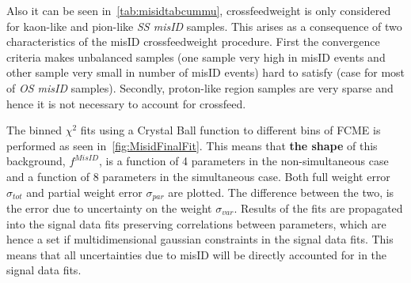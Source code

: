 Also it can be seen in~\autoref{tab:misidtabcummu}, crossfeedweight is only considered for kaon-like and pion-like \textit{SS misID} samples. This arises as a consequence of two characteristics of the misID crossfeedweight procedure. First the convergence criteria makes unbalanced samples (one sample very high in misID events and other sample very small in number of misID events) hard to satisfy (case for most of \textit{OS misID} samples). Secondly, proton-like region samples are very sparse and hence it is not necessary to account for crossfeed. %

The binned $\chi^{2}$ fits using a Crystal Ball function to different bins of FCME is performed as seen in~\autoref{fig:MisidFinalFit}. This means that \textbf{the shape} of this background, $f^{MisID}$, is a function of 4 parameters in the non-simultaneous case and a function of 8 parameters in the simultaneous case. Both full weight error $\sigma_{tot}$ and partial weight error $\sigma_{par}$ are plotted. The difference between the two, is the error due to uncertainty on the weight $\sigma_{var}$.  Results of the fits are propagated into the signal data fits preserving correlations between parameters, which are hence a set if multidimensional gaussian constraints in the signal data fits. This means that all uncertainties due to misID will be directly accounted for in the signal data fits.


